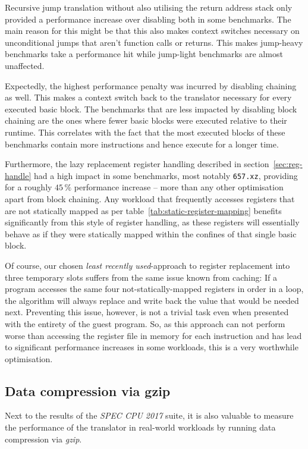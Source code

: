 Recursive jump translation without also utilising the return address stack only provided a performance increase over disabling both in some benchmarks.
The main reason for this might be that this also makes context switches necessary on unconditional jumps that aren't function calls or returns.
This makes jump-heavy benchmarks take a performance hit while jump-light benchmarks are almost unaffected.

Expectedly, the highest performance penalty was incurred by disabling chaining as well.
This makes a context switch back to the translator necessary for every executed basic block.
The benchmarks that are less impacted by disabling block chaining are the ones where fewer basic blocks were executed relative to their runtime.
This correlates with the fact that the most executed blocks of these benchmarks contain more instructions and hence execute for a longer time.

Furthermore, the lazy replacement register handling described in section~\ref{sec:reg-handle} had a high impact in some benchmarks, most notably \texttt{657.xz}, providing for a roughly $45\,\%$ performance increase -- more than any other optimisation apart from block chaining.
Any workload that frequently accesses registers that are not statically mapped as per table~\vref{tab:static-register-mapping} benefits significantly from this style of register handling, as these registers will essentially behave as if they were statically mapped within the confines of that single basic block.

Of course, our chosen \textit{least recently used}-approach to register replacement into three temporary slots suffers from the same issue known from caching:
If a program accesses the same four not-statically-mapped registers in order in a loop, the algorithm will always replace and write back the value that would be needed next.
Preventing this issue, however, is not a trivial task even when presented with the entirety of the guest program.
So, as this approach can not perform worse than accessing the register file in memory for each instruction and has lead to significant performance increases in some workloads, this is a very worthwhile optimisation.



\subsection{Data compression via gzip}
Next to the results of the \textit{SPEC CPU 2017} suite, it is also valuable to measure the performance of the translator in real-world workloads by running data compression via \textit{gzip}.


